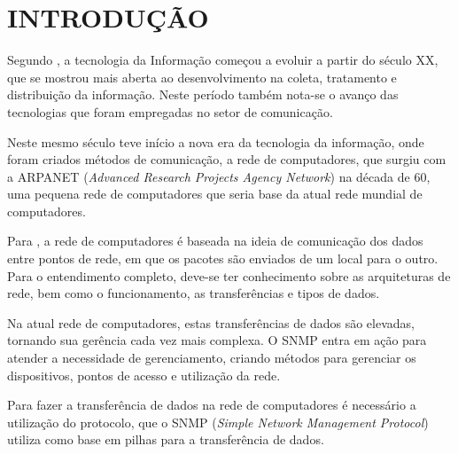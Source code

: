 \chapter*{INTRODUÇÃO}

\par Segundo , a tecnologia da
Informação começou a evoluir a partir do século XX, que se mostrou mais
aberta ao desenvolvimento na coleta, tratamento e distribuição da informação. 
Neste período também nota-se o avanço das tecnologias que foram empregadas
no setor de comunicação.

\par Neste mesmo século teve início a nova era da tecnologia da informação, onde
foram criados métodos de comunicação, a rede de computadores, que surgiu com a
ARPANET (\textit{Advanced Research Projects Agency Network}) na década de 60,
uma pequena rede de computadores que seria base da atual rede mundial de computadores.

\par Para , a rede de computadores é baseada
na ideia de comunicação dos dados entre pontos de rede, em que os pacotes são
enviados de um local para o outro. Para o entendimento completo, deve-se ter
conhecimento sobre as arquiteturas de rede, bem como o funcionamento, as
transferências e tipos de dados.

\par Na atual rede de computadores, estas transferências de dados são elevadas,
 tornando sua gerência cada vez mais complexa. O SNMP entra em ação
para atender a necessidade de gerenciamento, criando métodos 
para gerenciar os dispositivos, pontos de acesso e utilização da rede.


\par Para fazer a transferência de dados na rede de computadores é necessário a
utilização do protocolo, que o SNMP (\textit{Simple Network Management
Protocol}) utiliza como base em pilhas para a transferência de dados.


